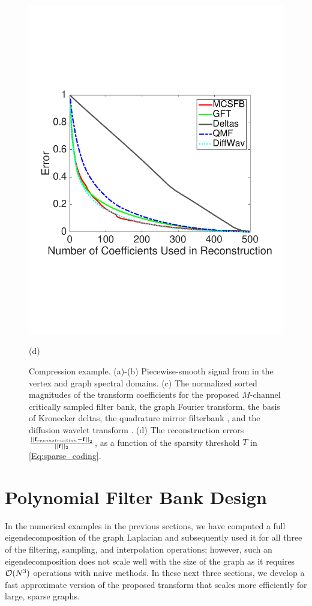 \documentclass[journal, 10pt]{IEEEtran}
\begin{document}
\begin{figure}[tbh]
\begin{minipage}[m]{0.48\linewidth}
\centerline{\includegraphics[width=.98\linewidth]{fig_comp_error}}
\centerline{\small{(d)}}
\end{minipage}
\caption{Compression example. (a)-(b) Piecewise-smooth signal from \cite[Fig. 11]{shuman_TSP_multiscale} in the vertex and graph spectral domains. (c) The normalized sorted magnitudes of the transform coefficients for the proposed $M$-channel critically sampled filter bank, the graph Fourier transform, the basis of Kronecker deltas, the quadrature mirror filterbank \cite{narang2012perfect}, and the diffusion wavelet transform \cite{coifman2006diffusion}. (d) The reconstruction errors  $\frac{\left|\left|{\bf f}_{\mbox{reconstruction}}-{\bf f}\right|\right|_2}{||{\bf f}||_2}$, as a function of the sparsity threshold $T$ in \eqref{Eq:sparse_coding}.} \label{Fig:comp}
\end{figure}


\section{Polynomial Filter Bank Design}
In the numerical examples in the previous sections, we have computed a full eigendecomposition of the graph Laplacian and subsequently used it for all three of the filtering, sampling, and interpolation operations; however, such an eigendecomposition does not scale well with the size of the graph as it requires ${\cal O}(N^3)$ operations with naive methods. In these next three sections, we develop a fast approximate version of the proposed transform that scales more efficiently for large, sparse graphs. 
\end{document}
